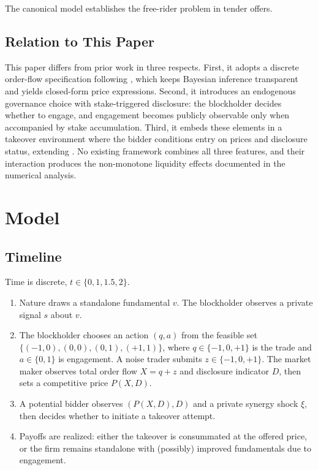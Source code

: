 \documentclass[11pt]{article}
\newcommand{\1}{\mathbf{1}}
\begin{document}
The canonical \citet{GrossmanHart1980} model establishes the free-rider problem in tender offers.

\subsection{Relation to This Paper}

This paper differs from prior work in three respects. First, it adopts a discrete order-flow specification following \citet{EdmansGoldsteinJiang2015}, which keeps Bayesian inference transparent and yields closed-form price expressions. Second, it introduces an endogenous governance choice with stake-triggered disclosure: the blockholder decides whether to engage, and engagement becomes publicly observable only when accompanied by stake accumulation. Third, it embeds these elements in a takeover environment where the bidder conditions entry on prices and disclosure status, extending \citet{EdmansGoldsteinJiang2012}. No existing framework combines all three features, and their interaction produces the non-monotone liquidity effects documented in the numerical analysis.

\section{Model}
\label{sec:model}

\subsection{Timeline}

Time is discrete, $t \in \{0, 1, 1.5, 2\}$.

\begin{enumerate}[leftmargin=2em]
\item[$t=0$:] Nature draws a standalone fundamental $v$. The blockholder observes a private signal $s$ about $v$.
\item[$t=1$:] The blockholder chooses an action $(q,a)$ from the feasible set $\{(-1,0),(0,0),(0,1),(+1,1)\}$, where $q \in \{-1,0,+1\}$ is the trade and $a \in \{0,1\}$ is engagement. A noise trader submits $z \in \{-1, 0, +1\}$. The market maker observes total order flow $X = q + z$ and disclosure indicator $D$, then sets a competitive price $P(X, D)$.
\item[$t=1.5$:] A potential bidder observes $(P(X,D), D)$ and a private synergy shock $\xi$, then decides whether to initiate a takeover attempt.
\item[$t=2$:] Payoffs are realized: either the takeover is consummated at the offered price, or the firm remains standalone with (possibly) improved fundamentals due to engagement.
\end{enumerate}
\end{document}
